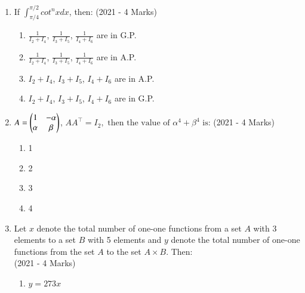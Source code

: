 \documentclass[journal]{IEEEtran}
\begin{document}
\begin{enumerate}
{        }
    \item{
     
            If $\int_{\pi/4}^{\pi/2}cot^nx dx$, then:\hfill
                {(2021 - 4 Marks)}
            \begin{multicols}{2}
                \begin{enumerate}
                    \item $\frac{1}{I_2 + I_4}$, $\frac{1}{I_3 + I_5}$, $\frac{1}{I_4 + I_6}$ are in G.P.
                    
                    \item $\frac{1}{I_2 + I_4}$, $\frac{1}{I_3 + I_5}$, $\frac{1}{I_4 + I_6}$ are in A.P.
                    
                    \item $I_2 + I_4$, $I_3 + I_5$, $I_4 + I_6$ are in A.P.
                    
                    \item $I_2 + I_4$, $I_3 + I_5$, $I_4 + I_6$ are in G.P.
                \end{enumerate}
            \end{multicols}
        
        }
    \item{
            $A = \begin{pmatrix} 1 & -\alpha \\ \alpha & \beta\end{pmatrix}$, $ AA^\top = I_2, \text{ then the value of } \alpha^4 + \beta^4 \text{ is:} $
           	\hfill
                {(2021 - 4 Marks)}
            
            \begin{multicols}{4}
				\begin{enumerate}
					\item 1
					\item 2
					\item 3
					\item 4
				\end{enumerate}
			\end{multicols}
        
        }
 	\item{
        	Let $x$ denote the total number of one-one functions from a set $A$ with 3 elements to a set $B$ with 5 elements and $y$ denote the total number of one-one functions from the set $A$ to the set $A \times B$. Then:\\ \text{ }
        	\hfill
        	{(2021 - 4 Marks)}
        	
        	\begin{multicols}{4}
        		\begin{enumerate}
					\item $y = 273x$
					

\end{enumerate}
\end{multicols}}
\end{enumerate}
\end{document}
